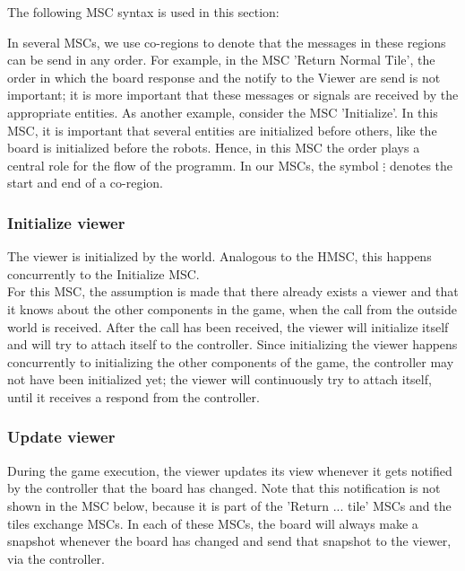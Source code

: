	The following MSC syntax is used in this section:

	

	In several MSCs, we use co-regions to denote that the messages in these regions can be send in any order. For example, in the MSC 'Return Normal Tile', the order in which the board response and the notify to the Viewer are send is not important; it is more important that these messages or signals are received by the appropriate entities. As another example, consider the MSC 'Initialize'. In this MSC, it is important that several entities are initialized before others, like the board is initialized before the robots. Hence, in this MSC the order plays a central role for the flow of the programm. In our MSCs, the symbol $\vdots$ denotes the start and end of a co-region.

	\subsubsection{Initialize viewer}
	\begin{minipage}{\linewidth}
		The viewer is initialized by the world. Analogous to the HMSC, this happens concurrently to the Initialize MSC. \\
For this MSC, the assumption is made that there already exists a viewer and that it knows about the other components in the game, when the call from the outside world is received. After the call has been received, the viewer will initialize itself and will try to attach itself to the controller. Since initializing the viewer happens concurrently to initializing the other components of the game, the controller may not have been initialized yet; the viewer will continuously try to attach itself, until it receives a respond from the controller.
	
		
	\end{minipage}

    	\subsubsection{Update viewer}
	\begin{minipage}{\linewidth}
		During the game execution, the viewer updates its view whenever it gets notified by the controller that the board has changed. Note that this notification is not shown in the MSC below, because it is part of the 'Return ... tile' MSCs and the tiles exchange MSCs. In each of these MSCs, the board will always make a snapshot whenever the board has changed and send that snapshot to the viewer, via the controller.

		
	\end{minipage}


